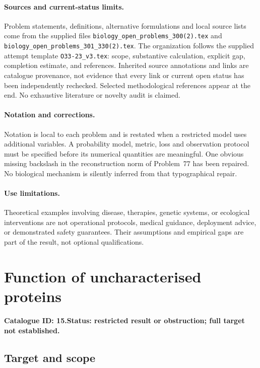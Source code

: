 \documentclass[11pt]{article}
\begin{document}
\paragraph{Sources and current-status limits.}
Problem statements, definitions, alternative formulations and local source lists
come from the supplied files
\texttt{biology\_open\_problems\_300(2).tex} and
\texttt{biology\_open\_problems\_301\_330(2).tex}.
The organization follows the supplied attempt template
\texttt{O33-23\_v3.tex}: scope, substantive calculation, explicit gap,
completion estimate, and references. Inherited source annotations and links are
catalogue provenance, not evidence that every link or current open status has
been independently rechecked. Selected methodological references appear at the
end. No exhaustive literature or novelty audit is claimed.

\paragraph{Notation and corrections.}
Notation is local to each problem and is restated when a restricted model uses
additional variables. A probability model, metric, loss and observation protocol
must be specified before its numerical quantities are meaningful. One obvious
missing backslash in the reconstruction norm of Problem~77 has been repaired.
No biological mechanism is silently inferred from that typographical repair.

\paragraph{Use limitations.}
Theoretical examples involving disease, therapies, genetic systems, or ecological
interventions are not operational protocols, medical guidance, deployment advice,
or demonstrated safety guarantees. Their assumptions and empirical gaps are part
of the result, not optional qualifications.

\setcounter{section}{14}
\section{Function of uncharacterised proteins}
\label{prob:015}
\noindent\textbf{Catalogue ID: 15.}\quad \textbf{Status: restricted result or obstruction; full target not established.}
\subsection{Target and scope}
\end{document}
